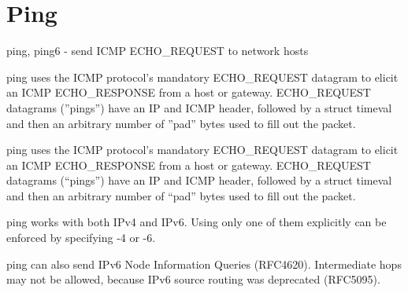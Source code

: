 \section{Ping}
ping, ping6 - send ICMP ECHO_REQUEST to network hosts

ping uses the ICMP protocol's mandatory ECHO_REQUEST datagram to elicit an ICMP ECHO_RESPONSE from a host or gateway. 
ECHO_REQUEST datagrams (''pings'') have an IP and ICMP header, followed by a struct timeval and then an arbitrary number of ''pad'' bytes used to fill out the packet.

ping uses the ICMP protocol's mandatory ECHO_REQUEST datagram to
       elicit an ICMP ECHO_RESPONSE from a host or gateway. ECHO_REQUEST
       datagrams (“pings”) have an IP and ICMP header, followed by a
       struct timeval and then an arbitrary number of “pad” bytes used to
       fill out the packet.

       ping works with both IPv4 and IPv6. Using only one of them
       explicitly can be enforced by specifying -4 or -6.

       ping can also send IPv6 Node Information Queries (RFC4620).
       Intermediate hops may not be allowed, because IPv6 source routing
       was deprecated (RFC5095).

